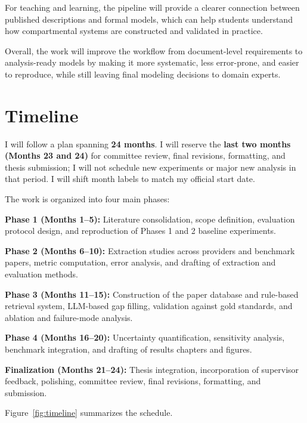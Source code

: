 \documentclass[a4paper,12pt]{article}
\begin{document}
For teaching and learning, the pipeline will provide a clearer connection between published descriptions and formal models, which can help students understand how compartmental systems are constructed and validated in practice.

Overall, the work will improve the workflow from document-level requirements to analysis-ready models by making it more systematic, less error-prone, and easier to reproduce, while still leaving final modeling decisions to domain experts.

\section{Timeline}

I will follow a plan spanning \textbf{24 months}. I will reserve the
\textbf{last two months (Months 23 and 24)} for committee review, final
revisions, formatting, and thesis submission; I will not schedule new
experiments or major new analysis in that period. I will shift month labels
to match my official start date.

The work is organized into four main phases:

\textbf{Phase 1 (Months 1--5):} Literature consolidation, scope definition,
evaluation protocol design, and reproduction of Phases 1 and 2 baseline experiments.

\textbf{Phase 2 (Months 6--10):} Extraction studies across providers and benchmark
papers, metric computation, error analysis, and drafting of extraction and
evaluation methods.

\textbf{Phase 3 (Months 11--15):} Construction of the paper database and
rule-based retrieval system, LLM-based gap filling, validation against gold
standards, and ablation and failure-mode analysis.

\textbf{Phase 4 (Months 16--20):} Uncertainty quantification, sensitivity
analysis, benchmark integration, and drafting of results chapters and figures.

\textbf{Finalization (Months 21--24):} Thesis integration, incorporation of
supervisor feedback, polishing, committee review, final revisions, formatting,
and submission.

Figure~\ref{fig:timeline} summarizes the schedule.
\end{document}
